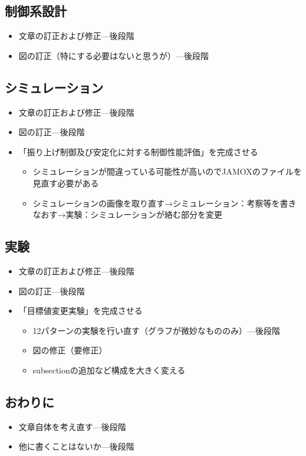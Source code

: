 	\subsection{制御系設計}
		\begin{itemize}
		  \item 文章の訂正および修正---後段階
		  \item 図の訂正（特にする必要はないと思うが）---後段階
		\end{itemize}
	\subsection{シミュレーション}
		\begin{itemize}
		  \item 文章の訂正および修正---後段階
		  \item 図の訂正---後段階
		  \item 「振り上げ制御及び安定化に対する制御性能評価」を完成させる
		  \begin{itemize}
		    \item シミュレーションが間違っている可能性が高いのでJAMOXのファイルを見直す必要がある
		    \item シミュレーションの画像を取り直す→シミュレーション：考察等を書きなおす→実験：シミュレーションが絡む部分を変更
		  \end{itemize}
		\end{itemize}
	\subsection{実験}
		\begin{itemize}
		  \item 文章の訂正および修正---後段階
		  \item 図の訂正---後段階
		  \item 「目標値変更実験」を完成させる
		   \begin{itemize}
		     \item 12パターンの実験を行い直す（グラフが微妙なもののみ）---後段階
		     \item 図の修正（要修正）
		     \item subsectionの追加など構成を大きく変える
		  \end{itemize}
		\end{itemize}
	\subsection{おわりに}
		\begin{itemize}
		  \item 文章自体を考え直す---後段階
		  \item 他に書くことはないか---後段階
		\end{itemize}
